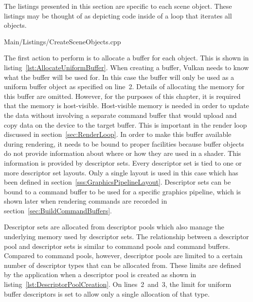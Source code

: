       The listings presented in this section are specific to each scene object.
      These listings may be thought of as depicting code inside of a loop that iterates all objects.

      
      {Main/Listings/CreateSceneObjects.cpp}

      The first action to perform is to allocate a buffer for each object.
      This is shown in listing~\ref{lst:AllocateUniformBuffer}.
      When creating a buffer, Vulkan needs to know what the buffer will be used for.
      In this case the buffer will only be used as a uniform buffer object as specified on line~2.
      Details of allocating the memory for this buffer are omitted.
      However, for the purposes of this chapter, it is required that the memory is host-visible.
      Host-visible memory is needed in order to update the data without involving a separate command buffer that would upload and copy data on the device to the target buffer.
      This is important in the render loop discussed in section~\ref{sec:RenderLoop}.
      In order to make this buffer available during rendering, it needs to be bound to proper facilities because buffer objects do not provide information about where or how they are used in a shader.
      This information is provided by descriptor sets.
      Every descriptor set is tied to one or more descriptor set layouts.
      Only a single layout is used in this case which has been defined in section~\ref{sss:GraphicsPipelineLayout}.
      Descriptor sets can be bound to a command buffer to be used for a specific graphics pipeline, which is shown later when rendering commands are recorded in section~\ref{sec:BuildCommandBuffers}.

      Descriptor sets are allocated from descriptor pools which also manage the underlying memory used by descriptor sets.
      The relationship between a descriptor pool and descriptor sets is similar to command pools and command buffers.
      Compared to command pools, however, descriptor pools are limited to a certain number of descriptor types that can be allocated from.
      These limits are defined by the application when a descriptor pool is created as shown in listing~\ref{lst:DescriptorPoolCreation}.
      On lines~2~and~3, the limit for uniform buffer descriptors is set to allow only a single allocation of that type.

